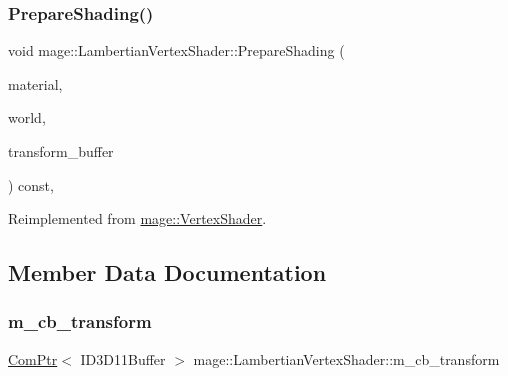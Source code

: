 \subsubsection{\texorpdfstring{Prepare\+Shading()}{PrepareShading()}}
{\footnotesize\ttfamily void mage\+::\+Lambertian\+Vertex\+Shader\+::\+Prepare\+Shading (\begin{DoxyParamCaption}\item[{const \hyperlink{structmage_1_1_material}{Material} \&}]{material,  }\item[{const \hyperlink{classmage_1_1_world}{World} \&}]{world,  }\item[{const Transform\+Buffer \&}]{transform\+\_\+buffer }\end{DoxyParamCaption}) const\hspace{0.3cm}{\ttfamily [override]}, {\ttfamily [virtual]}}



Reimplemented from \hyperlink{classmage_1_1_vertex_shader_a15a8b2c1a1a4c8fde3ff903c999ec218}{mage\+::\+Vertex\+Shader}.



\subsection{Member Data Documentation}
\hypertarget{classmage_1_1_lambertian_vertex_shader_aae0f2411821315d89eeb982e6c30c22e}{}\label{classmage_1_1_lambertian_vertex_shader_aae0f2411821315d89eeb982e6c30c22e} 
\subsubsection{\texorpdfstring{m\+\_\+cb\+\_\+transform}{m\_cb\_transform}}
{\footnotesize\ttfamily \hyperlink{namespacemage_ae74f374780900893caa5555d1031fd79}{Com\+Ptr}$<$ I\+D3\+D11\+Buffer $>$ mage\+::\+Lambertian\+Vertex\+Shader\+::m\+\_\+cb\+\_\+transform\hspace{0.3cm}{\ttfamily [private]}}


